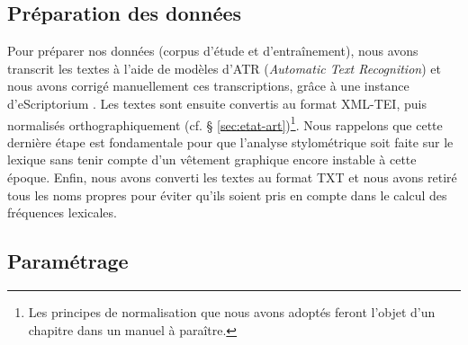 \documentclass[final, fra]{anthology-ch}
\begin{document}
\subsection{Préparation des données}
Pour préparer nos données (corpus d'étude et d'entraînement), nous avons transcrit les textes à l'aide de modèles d'ATR (\textit{Automatic Text Recognition}) et nous avons corrigé manuellement ces transcriptions, grâce à une instance d'eScriptorium \cite{unige_fondue, kiessling2019escriptorium,solfrini2024ocr}. Les textes sont ensuite convertis au format XML-TEI, puis normalisés orthographiquement (cf. § \ref{sec:etat-art})\footnote{Les principes de normalisation que nous avons adoptés feront l’objet d’un chapitre dans un manuel à paraître.}. Nous rappelons que cette dernière étape est fondamentale pour que l'analyse stylométrique soit faite sur le lexique sans tenir compte d'un vêtement graphique encore instable à cette époque.
Enfin, nous avons converti les textes au format TXT et nous avons retiré tous les noms propres pour éviter qu'ils soient pris en compte dans le calcul des fréquences lexicales.

\subsection{Paramétrage}
\end{document}
